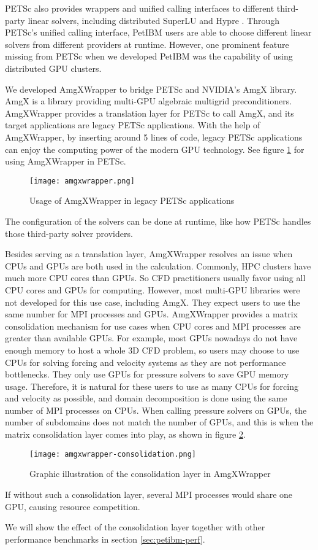 PETSc also provides wrappers and unified calling interfaces to different third-party linear solvers, including distributed SuperLU \cite{sao_communication-avoiding_2019} and Hypre \cite{noauthor_hypre_nodate}.
Through PETSc's unified calling interface, PetIBM users are able to choose different linear solvers from different providers at runtime. 
However, one prominent feature missing from PETSc when we developed PetIBM was the capability of using distributed GPU clusters.

We developed AmgXWrapper \cite{chuang_geoclaw-arcgis_2019} to bridge PETSc and NVIDIA's AmgX library.
AmgX is a library providing multi-GPU algebraic multigrid preconditioners.
AmgXWrapper provides a translation layer for PETSc to call AmgX, and its target applications are legacy PETSc applications. 
With the help of AmgXWrapper, by inserting around 5 lines of code, legacy PETSc applications can enjoy the computing power of the modern GPU technology.
See figure \ref{fig:amgxwrapper} for using AmgXWrapper in PETSc.
\begin{figure}[hbt!]
    \texttt{[image: amgxwrapper.png]}
    \caption{Usage of AmgXWrapper in legacy PETSc applications}
    \label{fig:amgxwrapper}
\end{figure}
The configuration of the solvers can be done at runtime, like how PETSc handles those third-party solver providers.

Besides serving as a translation layer, AmgXWrapper resolves an issue when CPUs and GPUs are both used in the calculation.
Commonly, HPC clusters have much more CPU cores than GPUs.
So CFD practitioners usually favor using all CPU cores and GPUs for computing.
However, most multi-GPU libraries were not developed for this use case, including AmgX.
They expect users to use the same number for MPI processes and GPUs.
AmgXWrapper provides a matrix consolidation mechanism for use cases when CPU cores and MPI processes are greater than available GPUs.
For example, most GPUs nowadays do not have enough memory to host a whole 3D CFD problem, so users may choose to use CPUs for solving forcing and velocity systems as they are not performance bottlenecks.
They only use GPUs for pressure solvers to save GPU memory usage.
Therefore, it is natural for these users to use as many CPUs for forcing and velocity as possible, and domain decomposition is done using the same number of MPI processes on CPUs.
When calling pressure solvers on GPUs, the number of subdomains does not match the number of GPUs, and this is when the matrix consolidation layer comes into play, as shown in figure \ref{fig:amgxwrapper-consolidation}.
\begin{figure}[hbt!]
    \texttt{[image: amgxwrapper-consolidation.png]}
    \caption{Graphic illustration of the consolidation layer in AmgXWrapper}
    \label{fig:amgxwrapper-consolidation}
\end{figure}
If without such a consolidation layer, several MPI processes would share one GPU, causing resource competition.

We will show the effect of the consolidation layer together with other performance benchmarks in section \ref{sec:petibm-perf}.
